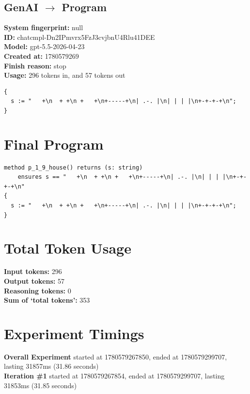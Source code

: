 \documentclass{article}
\begin{document}
\subsection*{GenAI $\rightarrow$ Program}
\textbf{System fingerprint: }null
\\\textbf{ID: }chatcmpl-Dn2IPmvrx5FzJ3cvjbnU4Rlu41DEE
\\\textbf{Model: }gpt-5.5-2026-04-23
\\\textbf{Created at: }1780579269
\\\textbf{Finish reason: }stop
\\\textbf{Usage: }296 tokens in, and 57 tokens out
\begin{lstlisting}
{
  s := "   +\n  + +\n +   +\n+-----+\n| .-. |\n| | | |\n+-+-+-+\n";
}
\end{lstlisting}
\section*{Final Program}
\begin{lstlisting}
method p_1_9_house() returns (s: string)
	ensures s == "   +\n  + +\n +   +\n+-----+\n| .-. |\n| | | |\n+-+-+-+\n"
{
  s := "   +\n  + +\n +   +\n+-----+\n| .-. |\n| | | |\n+-+-+-+\n";
}
\end{lstlisting}
\section*{Total Token Usage}
\textbf{Input tokens: }296
\\\textbf{Output tokens: }57
\\\textbf{Reasoning tokens: }0
\\\textbf{Sum of `total tokens': }353
\section*{Experiment Timings}
\textbf{Overall Experiment} started at 1780579267850, ended at 1780579299707, lasting 31857ms (31.86 seconds)
\\\textbf{Iteration \#1} started at 1780579267854, ended at 1780579299707, lasting 31853ms (31.85 seconds)
\end{document}
